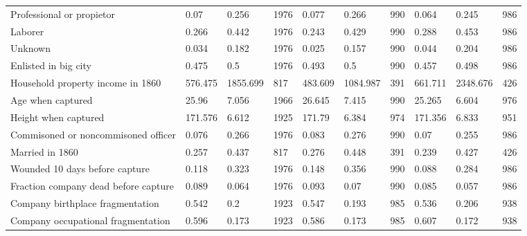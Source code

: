 \documentclass[a4paper]{report}\usepackage{graphicx, color}
\begin{document}
\begin{refsection}
\begin{table}
\begin{tabular}{llllllllll}
Professional or propietor         & 0.07                    & 0.256                                & 1976                                   & 0.077 & 0.266 & 990 & 0.064 & 0.245 & 986 \\
Laborer                           & 0.266                   & 0.442                                & 1976                                   & 0.243 & 0.429 & 990 & 0.288 & 0.453 & 986 \\
Unknown                           & 0.034                   & 0.182                                & 1976                                   & 0.025 & 0.157 & 990 & 0.044 & 0.204 & 986 \\
Enlisted in big city              & 0.475                   & 0.5                                  & 1976                                   & 0.493 & 0.5 & 990 & 0.457 & 0.498 & 986 \\
Household property income in 1860 & 576.475                 & 1855.699                             & 817                                    & 483.609 & 1084.987 & 391 & 661.711 & 2348.676 & 426 \\
Age when captured                 & 25.96                   & 7.056                                & 1966                                   & 26.645 & 7.415 & 990 & 25.265 & 6.604 & 976 \\
Height when captured                 & 171.576 & 6.612 & 1925 & 171.79 & 6.384 & 974 & 171.356 & 6.833 & 951 \\
Commisoned or noncommisoned officer  & 0.076   & 0.266 & 1976 & 0.083  & 0.276 & 990 & 0.07    & 0.255 & 986 \\
Married in 1860                      & 0.257   & 0.437 & 817  & 0.276  & 0.448 & 391 & 0.239   & 0.427 & 426 \\
Wounded 10 days before capture       & 0.118   & 0.323 & 1976 & 0.148  & 0.356 & 990 & 0.088   & 0.284 & 986 \\
Fraction company dead before capture & 0.089   & 0.064 & 1976 & 0.093  & 0.07  & 990 & 0.085   & 0.057 & 986 \\
Company birthplace fragmentation     & 0.542   & 0.2   & 1923 & 0.547  & 0.193 & 985 & 0.536   & 0.206 & 938 \\
Company occupational fragmentation   & 0.596   & 0.173 & 1923 & 0.586  & 0.173 & 985 & 0.607   & 0.172 & 938 \\
\end{tabular}
\end{table}


\end{refsection}
\end{document}
